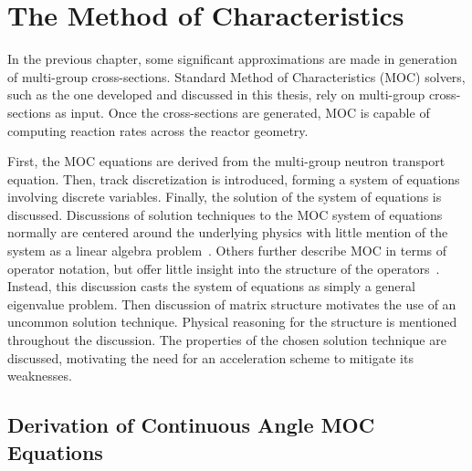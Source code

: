 \chapter{The Method of Characteristics}
\label{chap:moc}

In the previous chapter, some significant approximations are made in generation of multi-group cross-sections. Standard Method of Characteristics (MOC) solvers, such as the one developed and discussed in this thesis, rely on multi-group cross-sections as input. Once the cross-sections are generated, MOC is capable of computing reaction rates across the reactor geometry.

First, the MOC equations are derived from the multi-group neutron transport equation. Then, track discretization is introduced, forming a system of equations involving discrete variables. Finally, the solution of the system of equations is discussed. Discussions of solution techniques to the MOC system of equations normally are centered around the underlying physics with little mention of the system as a linear algebra problem~\cite{boyd2014openmoc}. Others further describe MOC in terms of operator notation, but offer little insight into the structure of the operators~\cite{kochunas}. Instead, this discussion casts the system of equations as simply a general eigenvalue problem. Then discussion of matrix structure motivates the use of an uncommon solution technique. Physical reasoning for the structure is mentioned throughout the discussion. The properties of the chosen solution technique are discussed, motivating the need for an acceleration scheme to mitigate its weaknesses.


\section{Derivation of Continuous Angle MOC Equations}
\label{sec:derivation-of-moc}

